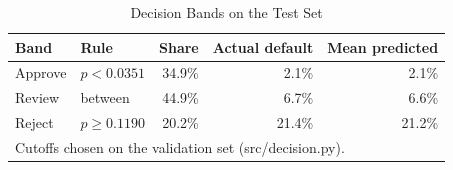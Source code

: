 \begin{table}[t]
\caption{Decision Bands on the Test Set}
\label{tab:bands}
\centering
\setlength{\tabcolsep}{4pt}
\begin{tabular}{llrrr}
\hline
\textbf{Band} & \textbf{Rule} & \textbf{Share} & \textbf{Actual default} & \textbf{Mean predicted} \\
\hline
Approve & $p < 0.0351$ & 34.9\% & 2.1\% & 2.1\% \\
Review & between & 44.9\% & 6.7\% & 6.6\% \\
Reject & $p \geq 0.1190$ & 20.2\% & 21.4\% & 21.2\% \\
\hline
\multicolumn{5}{p{0.92\linewidth}}{\footnotesize Cutoffs chosen on the validation set (src/decision.py).} \\
\end{tabular}
\end{table}
